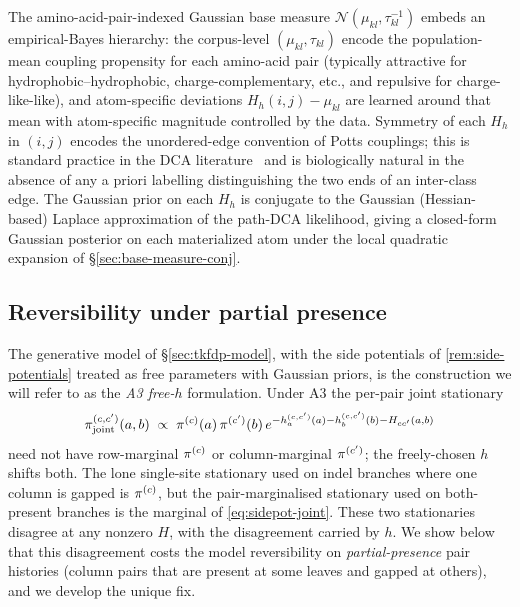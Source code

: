 \begin{remark}
The amino-acid-pair-indexed Gaussian base measure
$\mathcal{N}(\mu_{kl}, \tau_{kl}^{-1})$ embeds an empirical-Bayes
hierarchy: the corpus-level $(\mu_{kl}, \tau_{kl})$ encode the
population-mean coupling propensity for each amino-acid pair
(typically attractive for hydrophobic--hydrophobic,
charge-complementary, etc., and repulsive for charge-like-like), and
atom-specific deviations $H_h(i, j) - \mu_{kl}$ are learned around
that mean with atom-specific magnitude controlled by the data.
Symmetry of each $H_h$ in $(i, j)$ encodes the unordered-edge
convention of Potts couplings; this is standard practice in the DCA
literature~\citep{ekeberg2013} and is biologically natural in the
absence of any a priori labelling distinguishing the two ends of an
inter-class edge. The Gaussian prior on each $H_h$ is conjugate to
the Gaussian (Hessian-based) Laplace approximation of the path-DCA
likelihood, giving a closed-form Gaussian posterior on each
materialized atom under the local quadratic expansion of
\S\ref{sec:base-measure-conj}.
\end{remark}

\subsection{Reversibility under partial presence}
\label{sec:rev-suppl}

The generative model of \S\ref{sec:tkfdp-model}, with the side
potentials of \autoref{rem:side-potentials} treated as
free parameters with Gaussian priors, is the construction we
will refer to as the \emph{A3 free-$h$} formulation. Under A3 the
per-pair joint stationary
\begin{equation}
  \pi_{\mathrm{joint}}^{(c,c')}(a,b)\;\propto\;\pi^{(c)}(a)\,\pi^{(c')}(b)\,
    e^{-h^{(c,c')}_a(a)-h^{(c,c')}_b(b)-H_{cc'}(a,b)}
  \label{eq:sidepot-joint}
\end{equation}
need not have row-marginal $\pi^{(c)}$ or column-marginal
$\pi^{(c')}$; the freely-chosen $h$ shifts both. The lone single-site
stationary used on indel branches where one column is gapped is
$\pi^{(c)}$, but the pair-marginalised stationary used on
both-present branches is the marginal of \eqref{eq:sidepot-joint}.
These two stationaries disagree at any nonzero $H$, with the
disagreement carried by $h$. We show below that this disagreement
costs the model reversibility on \emph{partial-presence} pair
histories (column pairs that are present at some leaves and gapped
at others), and we develop the unique fix.

